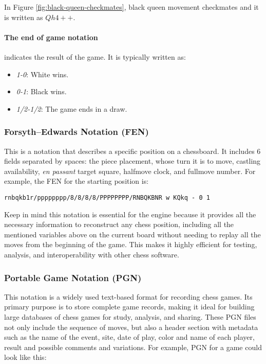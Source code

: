 \noindent In Figure \ref{fig:black-queen-checkmates}, black queen movement checkmates and it is written as $Qh4++$.

\paragraph{The end of game notation} indicates the result of the game. It is typically written as:

\begin{itemize}
    \item \textit{1-0}: White wins.
    \item \textit{0-1}: Black wins.
    \item \textit{1/2-1/2}: The game ends in a draw.
\end{itemize}

\subsubsection{Forsyth–Edwards Notation (FEN)}

This is a notation that describes a specific position on a chessboard. It includes 6 fields separated by spaces: the piece placement, whose turn it is to move, castling availability, \textit{en passant} target square, halfmove clock, and fullmove number.
For example, the FEN for the starting position is:
\begin{verbatim}
rnbqkb1r/pppppppp/8/8/8/8/PPPPPPPP/RNBQKBNR w KQkq - 0 1
\end{verbatim}

\vspace{1em}

\noindent Keep in mind this notation is essential for the engine because it provides all the necessary information to reconstruct any chess position, including all the mentioned variables above on the current board without needing to replay all the moves from the beginning of the game. This makes it highly efficient for testing, analysis, and interoperability with other chess software.

\subsubsection{Portable Game Notation (PGN)}

This notation is a widely used text-based format for recording chess games. Its primary purpose is to store complete game records, making it ideal for building large databases of chess games for study, analysis, and sharing. These PGN files not only include the sequence of moves, but also a header section with metadata such as the name of the event, site, date of play, color and name of each player, result and possible comments and variations. For example, PGN for a game could look like this:


